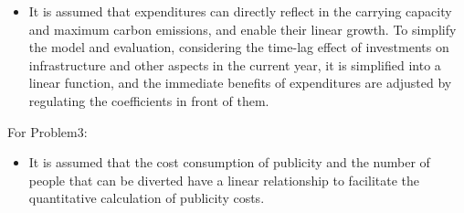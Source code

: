 \documentclass[12pt]{article}  %
\begin{document}
\begin{itemize}
	\item It is assumed that expenditures can directly reflect in the carrying capacity and maximum carbon emissions, and enable their linear growth. To simplify the model and evaluation, considering the time-lag effect of investments on infrastructure and other aspects in the current year, it is simplified into a linear function, and the immediate benefits of expenditures are adjusted by regulating the coefficients in front of them.
\end{itemize}

For Problem3:
\begin{itemize}
	\item It is assumed that the cost consumption of publicity and the number of people that can be diverted have a linear relationship to facilitate the quantitative calculation of publicity costs.
\end{itemize}
\end{document}
